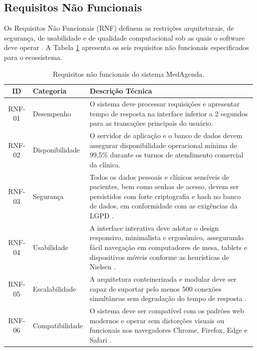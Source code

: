 \subsection{Requisitos Não Funcionais}

Os Requisitos Não Funcionais (RNF) definem as restrições arquiteturais, de segurança, de usabilidade e de qualidade computacional sob as quais o software deve operar \cite{sommerville2011}. A Tabela \ref{tab:rnf} apresenta os seis requisitos não funcionais especificados para o ecossistema.

\begin{table}[htbp]
\centering
\small
\caption{Requisitos não funcionais do sistema MedAgenda.}
\label{tab:rnf}
\begin{tabularx}{\textwidth}{|c|l|>{\RaggedRight\arraybackslash}X|}
\hline
\textbf{ID} & \textbf{Categoria} & \textbf{Descrição Técnica} \\
\hline
RNF-01 & Desempenho & O sistema deve processar requisições e apresentar tempo de resposta na interface inferior a 2 segundos para as transações principais do usuário. \\
\hline
RNF-02 & Disponibilidade & O servidor de aplicação e o banco de dados devem assegurar disponibilidade operacional mínima de 99,5\% durante os turnos de atendimento comercial da clínica. \\
\hline
RNF-03 & Segurança & Todos os dados pessoais e clínicos sensíveis de pacientes, bem como senhas de acesso, devem ser persistidos com forte criptografia e hash no banco de dados, em conformidade com as exigências da LGPD \cite{silberschatz2020}. \\
\hline
RNF-04 & Usabilidade & A interface interativa deve adotar o design responsivo, minimalista e ergonômico, assegurando fácil navegação em computadores de mesa, tablets e dispositivos móveis conforme as heurísticas de Nielsen \cite{nielsen1993, norman2013}. \\
\hline
RNF-05 & Escalabilidade & A arquitetura conteinerizada e modular deve ser capaz de suportar pelo menos 500 conexões simultâneas sem degradação do tempo de resposta \cite{burns2018}. \\
\hline
RNF-06 & Compatibilidade & O sistema deve ser compatível com os padrões web modernos e operar sem distorções visuais ou funcionais nos navegadores Chrome, Firefox, Edge e Safari \cite{bassi2015}. \\
\hline
\end{tabularx}\\
\autoria
\end{table}

